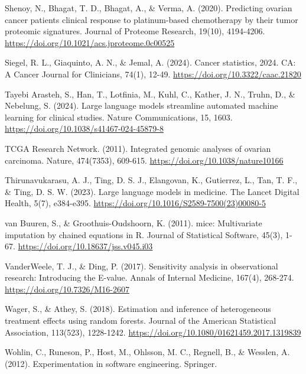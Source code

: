 Shenoy, N., Bhagat, T. D., Bhagat, A., \& Verma, A. (2020). Predicting ovarian cancer patients\textquotesingle{} clinical response to platinum-based chemotherapy by their tumor proteomic signatures. Journal of Proteome Research, 19(10), 4194-4206. \href{https://pubs.acs.org/doi/10.1021/acs.jproteome.0c00525}{https://doi.org/10.1021/acs.jproteome.0c00525}

Siegel, R. L., Giaquinto, A. N., \& Jemal, A. (2024). Cancer statistics, 2024. CA: A Cancer Journal for Clinicians, 74(1), 12-49. \href{https://acsjournals.onlinelibrary.wiley.com/doi/10.3322/caac.21820}{https://doi.org/10.3322/caac.21820}

Tayebi Arasteh, S., Han, T., Lotfinia, M., Kuhl, C., Kather, J. N., Truhn, D., \& Nebelung, S. (2024). Large language models streamline automated machine learning for clinical studies. Nature Communications, 15, 1603. \href{https://www.nature.com/articles/s41467-024-45879-8}{https://doi.org/10.1038/s41467-024-45879-8}

TCGA Research Network. (2011). Integrated genomic analyses of ovarian carcinoma. Nature, 474(7353), 609-615. \href{https://www.nature.com/articles/nature10166}{https://doi.org/10.1038/nature10166}

Thirunavukarasu, A. J., Ting, D. S. J., Elangovan, K., Gutierrez, L., Tan, T. F., \& Ting, D. S. W. (2023). Large language models in medicine. The Lancet Digital Health, 5(7), e384-e395. \href{https://www.nature.com/articles/s41591-023-02448-8}{https://doi.org/10.1016/S2589-7500(23)00080-5}

van Buuren, S., \& Groothuis-Oudshoorn, K. (2011). mice: Multivariate imputation by chained equations in R. Journal of Statistical Software, 45(3), 1-67. \href{https://www.jstatsoft.org/article/view/v045i03}{https://doi.org/10.18637/jss.v045.i03}

VanderWeele, T. J., \& Ding, P. (2017). Sensitivity analysis in observational research: Introducing the E-value. Annals of Internal Medicine, 167(4), 268-274. \href{https://doi.org/10.7326/M16-2607}{https://doi.org/10.7326/M16-2607}

Wager, S., \& Athey, S. (2018). Estimation and inference of heterogeneous treatment effects using random forests. Journal of the American Statistical Association, 113(523), 1228-1242. \href{https://www.tandfonline.com/doi/full/10.1080/01621459.2017.1319839}{https://doi.org/10.1080/01621459.2017.1319839}

Wohlin, C., Runeson, P., Host, M., Ohlsson, M. C., Regnell, B., \& Wesslen, A. (2012). Experimentation in software engineering. Springer.

